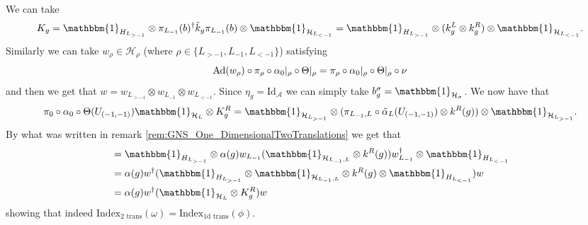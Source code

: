 \documentclass[12pt,a4paper,twoside]{article}
\let\originalleft\left
\let\originalright\right
\renewcommand{\left}{\mathopen{}\mathclose\bgroup\originalleft}
\renewcommand{\right}{\aftergroup\egroup\originalright}
\newcommand{\HH}{\mathcal H}
\renewcommand{\AA}{\mathcal A}
\newcommand{\id}{\mathbbm{1}}
\newcommand{\Ad}[1]{\textrm{Ad}\left(#1\right)}
\theoremstyle{definition}
\numberwithin{equation}{section}
\begin{document}
We can take
\begin{equation}
	K_g=\id_{H_{L_{>-1}}}\otimes \pi_{L_{-1}}(b)^\dagger \tilde k_g \pi_{L_{-1}}(b) \otimes\id_{\HH_{L_{<-1}}} =\id_{H_{L_{>-1}}}\otimes (k_g^L\otimes k_g^R) \otimes\id_{\HH_{L_{<-1}}}.
\end{equation}
Similarly we can take $w_\rho\in\HH_\rho$ (where $\rho\in\{L_{>-1},L_{-1},L_{<-1}\}$) satisfying
\begin{equation}
	\Ad{w_\rho}\circ\pi_\rho\circ\alpha_{0}|_\rho\circ\Theta|_\rho=\pi_\rho\circ\alpha_{0}|_\rho\circ\Theta|_\rho\circ\nu
\end{equation}
and then we get that $w=w_{L_{>-1}}\otimes w_{L_{-1}}\otimes w_{L_{<-1}}$. Since $\eta_g=\textrm{Id}_{\AA}$ we can simply take $b_g^\sigma=\id_{\HH_\sigma}$. We now have that
\begin{equation}
	\pi_0\circ\alpha_0\circ\Theta(U_{(-1,-1)})\id_{\HH_L}\otimes K_g^R=\id_{\HH_{L_{>-1}}}\otimes(\pi_{L_{-1},L}\circ\tilde\alpha_L(U_{(-1,-1)})\otimes k^R(g))\otimes\id_{\HH_{L_{>-1}}}.
\end{equation}
By what was written in remark \ref{rem:GNS_One_DimensionalTwoTranslations} we get that
\begin{align}
	&=\id_{H_{L_{>-1}}}\otimes\alpha(g) w_{L_{-1}}(\id_{\HH_{L_{-1},L}}\otimes k^R(g))w_{L_{-1}}^\dagger\otimes \id_{H_{L_{<-1}}}\\
	&=\alpha(g)w^\dagger (\id_{H_{L_{>-1}}}\otimes \id_{\HH_{L_{-1},L}}\otimes k^R(g)\otimes \id_{H_{L_{<-1}}}) w\\
	&=\alpha(g)w^\dagger (\id_{\HH_L}\otimes K^R_g) w
\end{align}
showing that indeed $\textrm{Index}_{\text{2 trans}}(\omega)=\textrm{Index}_{\text{1d trans}}(\phi)$.
\end{document}
